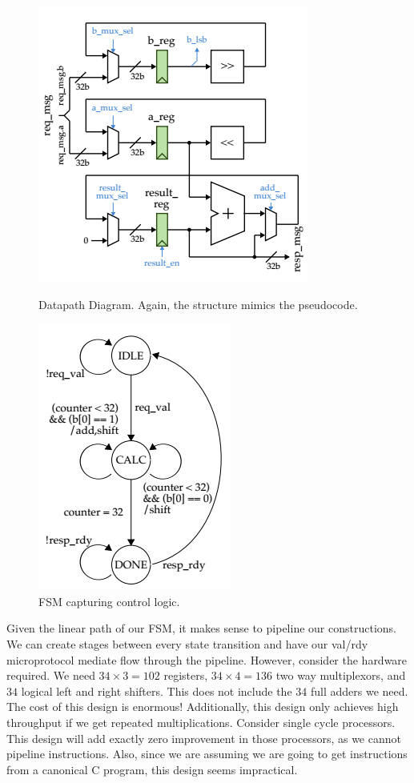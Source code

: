 \documentclass[10pt]{article}
\begin{document}
\begin{figure}[b]
    \begin{minipage}{.5\textwidth}
        \centering
        \includegraphics[scale=0.4]{Datapath}
        \caption{Datapath Diagram. Again, the structure mimics the pseudocode.}
        \label{fig:datapath}
    \end{minipage}%
    \begin{minipage}{.5\textwidth}
        \centering
        \includegraphics[scale=0.4]{BaseFSM}
        \caption{FSM capturing control logic.}
        \label{fig:BaseFSM}
    \end{minipage}
\end{figure}

Given the linear path of our FSM, it makes sense to pipeline our constructions.
We can create stages between every state transition and have our val/rdy microprotocol mediate flow through the pipeline.
However, consider the hardware required. We need $34 \times 3 = 102$ registers, $34 \times 4 = 136$ two way multiplexors,
and $34$ logical left and right shifters.
This does not include the $34$ full adders we need. 
The cost of this design is enormous!
Additionally, this design only achieves high throughput if we get repeated multiplications.
Consider single cycle processors.
This design will add exactly zero improvement in those processors, as we cannot pipeline instructions. 
Also, since we are assuming we are going to get instructions from a canonical C program, this design seems impractical.
\end{document}
